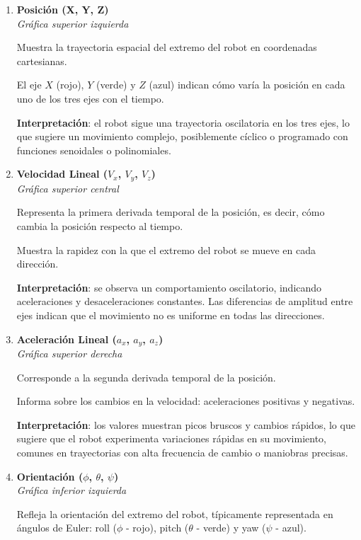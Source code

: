  \begin{enumerate}
 	\item \textbf{Posición (X, Y, Z)} \\
 	\textit{Gráfica superior izquierda}
 	
 	Muestra la trayectoria espacial del extremo del robot en coordenadas cartesianas.
 	
 	El eje $X$ (rojo), $Y$ (verde) y $Z$ (azul) indican cómo varía la posición en cada uno de los tres ejes con el tiempo.
 	
 	\textbf{Interpretación}: el robot sigue una trayectoria oscilatoria en los tres ejes, lo que sugiere un movimiento complejo, posiblemente cíclico o programado con funciones senoidales o polinomiales.
 	
 	\item \textbf{Velocidad Lineal ($V_x$, $V_y$, $V_z$)} \\
 	\textit{Gráfica superior central}
 	
 	Representa la primera derivada temporal de la posición, es decir, cómo cambia la posición respecto al tiempo.
 	
 	Muestra la rapidez con la que el extremo del robot se mueve en cada dirección.
 	
 	\textbf{Interpretación}: se observa un comportamiento oscilatorio, indicando aceleraciones y desaceleraciones constantes. Las diferencias de amplitud entre ejes indican que el movimiento no es uniforme en todas las direcciones.
 	
 	\item \textbf{Aceleración Lineal ($a_x$, $a_y$, $a_z$)} \\
 	\textit{Gráfica superior derecha}
 	
 	Corresponde a la segunda derivada temporal de la posición.
 	
 	Informa sobre los cambios en la velocidad: aceleraciones positivas y negativas.
 	
 	\textbf{Interpretación}: los valores muestran picos bruscos y cambios rápidos, lo que sugiere que el robot experimenta variaciones rápidas en su movimiento, comunes en trayectorias con alta frecuencia de cambio o maniobras precisas.
 	
 	\item \textbf{Orientación ($\phi$, $\theta$, $\psi$)} \\
 	\textit{Gráfica inferior izquierda}
 	
 	Refleja la orientación del extremo del robot, típicamente representada en ángulos de Euler: roll ($\phi$ - rojo), pitch ($\theta$ - verde) y yaw ($\psi$ - azul).
 	

\end{enumerate}
